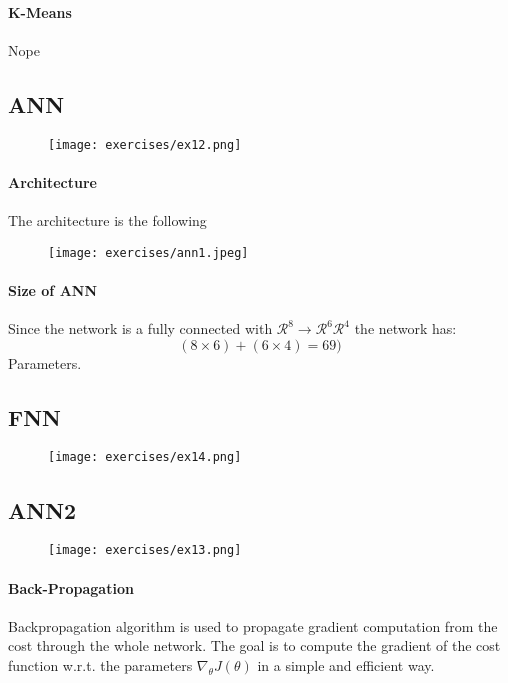 \paragraph{K-Means}
Nope
\subsection{ANN}
\begin{figure}[H]
    \centering
    \texttt{[image: exercises/ex12.png]}
\end{figure}

\paragraph{Architecture}
The architecture is the following
\begin{figure}[H]
    \centering
    \texttt{[image: exercises/ann1.jpeg]}
\end{figure}

\paragraph{Size of ANN}
Since the network is a fully connected with $\mathcal{R}^8\rightarrow\mathcal{R}^6\mathcal{R}^4$ the network has:
\[(8 \times 6)+(6\times 4)=69)\]
Parameters.



\subsection{FNN}
\begin{figure}[H]
    \centering
    \texttt{[image: exercises/ex14.png]}
\end{figure}


\subsection{ANN2}

\begin{figure}[H]
    \centering
    \texttt{[image: exercises/ex13.png]}
\end{figure}



\paragraph{Back-Propagation}
Backpropagation algorithm is used to propagate gradient computation from the cost through the whole network. The goal is to compute the gradient of the cost function w.r.t. the parameters $\nabla_{\theta}J(\theta)$ in a simple and efficient way.

